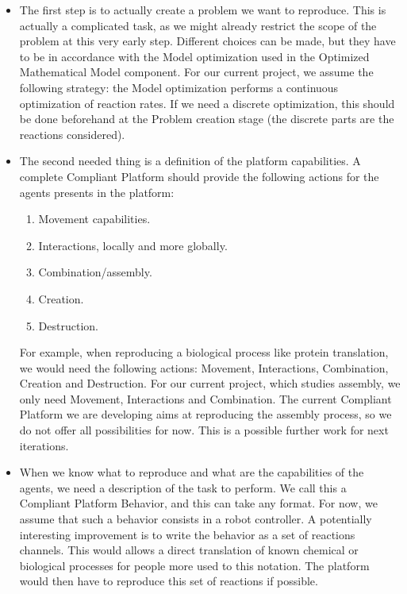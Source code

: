 \documentclass[letterpaper, oneside]{article}
\begin{document}
\begin{itemize}
	\item The first step is to actually create a problem we want to reproduce. This is actually a complicated task, as we might already restrict the scope of the problem at this very early step. Different choices can be made, but they have to be in accordance with the Model optimization used in the Optimized Mathematical Model component. For our current project, we assume the following strategy: the Model optimization performs a continuous optimization of reaction rates. If we need a discrete optimization, this should be done beforehand at the Problem creation stage (the discrete parts are the reactions considered).
	\item The second needed thing is a definition of the platform capabilities. A complete Compliant Platform should provide the following actions for the agents presents in the platform:
		\begin{enumerate}
			\item Movement capabilities.
			\item Interactions, locally and more globally.
			\item Combination/assembly.
			\item Creation.
			\item Destruction.
		\end{enumerate}
	For example, when reproducing a biological process like protein translation, we would need the following actions: Movement, Interactions, Combination, Creation and Destruction. For our current project, which studies assembly, we only need Movement, Interactions and Combination.
	The current Compliant Platform we are developing aims at reproducing the assembly process, so we do not offer all possibilities for now. This is a possible further work for next iterations.
	\item When we know what to reproduce and what are the capabilities of the agents, we need a description of the task to perform. We call this a Compliant Platform Behavior, and this can take any format. For now, we assume that such a behavior consists in a robot controller. A potentially interesting improvement is to write the behavior as a set of reactions channels. This would allows a direct translation of known chemical or biological processes for people more used to this notation. The platform would then have to reproduce this set of reactions if possible. 
\end{itemize}

\end{document}
